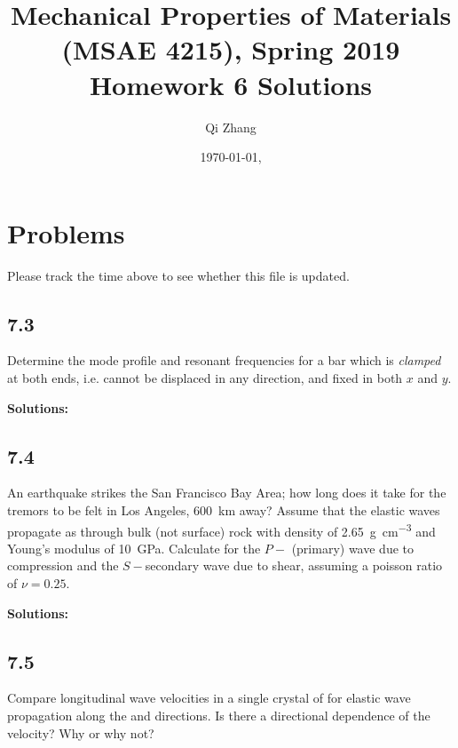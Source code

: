 \documentclass[12pt]{article}
\begin{document}

\title{Mechanical Properties of Materials (MSAE 4215), Spring 2019\\ Homework 6 Solutions}
\author{Qi Zhang}
\date{\today, \currenttime}

\maketitle

\tableofcontents
\listoftables

\section{Problems}
Please track the time above to see whether this file is updated.

\subsection{7.3}
Determine the mode profile and resonant frequencies for a bar which is \textit{clamped}
at both ends, i.e. cannot be displaced in any direction, and fixed in both $x$ and $y$.

\textbf{Solutions:}

\subsection{7.4}
An earthquake strikes the San Francisco Bay Area;
how long does it take for the tremors to be felt in Los Angeles, \SI{600}{\kilo\meter} away?
Assume that the elastic waves propagate as through bulk (not surface) rock with density
of \SI{2.65}{\gram \per \cubic \centi \meter} and Young's modulus of \SI{10}{\giga\pascal}.
Calculate for the $P-$ (primary) wave due to compression and the
$S-$secondary wave due to shear, assuming a poisson ratio of $\nu= 0.25$.

\textbf{Solutions:}

\subsection{7.5}
Compare longitudinal wave velocities in a single crystal of  for elastic wave
propagation along the \hkl[100] and \hkl[110] directions.  Is there a directional dependence of the velocity?
Why or why not?
\end{document}
